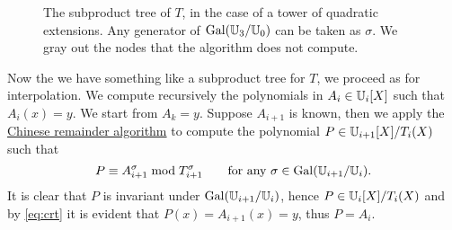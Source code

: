 \begin{figure}[tb]
  \centering
  
  \hfill
  
  \caption{The subproduct tree of $T$, in the case of a tower of
    quadratic extensions. Any generator of $\operatorname{Gal}(\mathbb{U}_3/\mathbb{U}_0)$ can be
    taken as $\sigma$. We gray out the nodes that the algorithm does
    not compute.}
  \label{fig:tree}
\end{figure}


Now the we have something like a subproduct tree for $T$, we proceed
as for interpolation. We compute recursively the polynomials in
$A_i\in\mathbb{U}_i[X]$ such that $A_i(x)=y$. We start from $A_k=y$. Suppose
$A_{i+1}$ is known, then we apply the
\hyperref[sec:chin-rema-algor]{Chinese remainder algorithm} to compute
the polynomial $P\in\mathbb{U}_{i+1}[X]/T_i(X)$ such that
\begin{equation}
  \label{eq:crt}
  P \equiv A_{i+1}^\sigma \bmod T_{i+1}^\sigma
  \qquad\text{for any $\sigma\in\operatorname{Gal}(\mathbb{U}_{i+1}/\mathbb{U}_i)$.}
\end{equation}
It is clear that $P$ is invariant under $\operatorname{Gal}(\mathbb{U}_{i+1}/\mathbb{U}_i)$, hence
$P\in\mathbb{U}_i[X]/T_i(X)$ and by \eqref{eq:crt} it is evident that
$P(x)=A_{i+1}(x)=y$, thus $P=A_i$.

